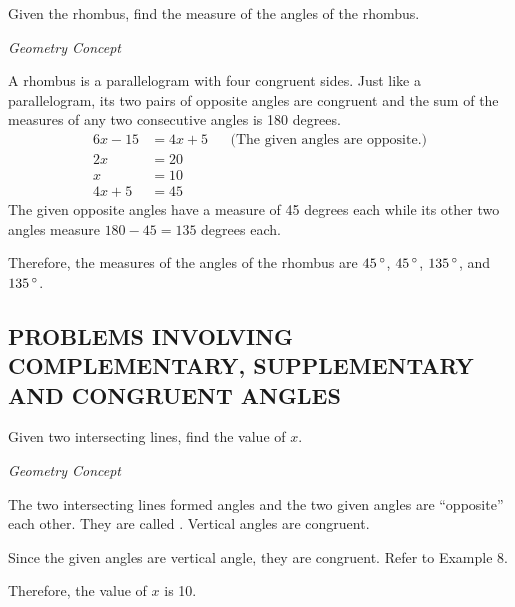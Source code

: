 \begin{example}
\Item Given the rhombus, find the measure of the angles of the rhombus.


\Solution

\textit{Geometry Concept}

A rhombus is a parallelogram with four congruent sides. Just like a parallelogram, its two pairs of
opposite angles are congruent and the sum of the measures of any two consecutive angles is 180
degrees.
%
\begin{align*}
6x - 15 &= 4x + 5 && \text{(The given angles are opposite.)}\\
2x &= 20\\
x &= 10\\
4x + 5 &= 45
\end{align*}
The given opposite angles have a measure of 45 degrees each while its other two angles
measure $180 - 45 = 135$ degrees each.

Therefore, the measures of the angles of the rhombus are $45\,\mathrm{^{\circ}}$, $45\,\mathrm{^{\circ}}$, $135\,\mathrm{^{\circ}}$, and $135\,\mathrm{^{\circ}}$.
\end{example}
\subsection*{PROBLEMS INVOLVING COMPLEMENTARY, SUPPLEMENTARY AND CONGRUENT ANGLES}
\begin{example}
\item Given two intersecting lines, find the value of $x$.


\Solution

\textit{Geometry Concept}

The two intersecting lines formed angles and the two given angles are “opposite” each other. They are
called . Vertical angles are congruent. 

Since the given angles are vertical angle, they are congruent. Refer to Example 8.

Therefore, the value of $x$ is 10.
\end{example}

